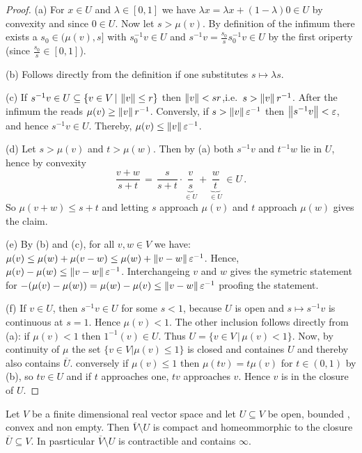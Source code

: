 \begin{proof}
(a) For $x\in U$ and $\lambda\in [0,1]$ we have $\lambda x=\lambda x+(1-\lambda)0\in U$ by convexity and since $0\in U$. Now let $s>\mu(v)$. 
By definition of the infimum there exists a $s_0\in ( \mu(v),s]$ with $s_0^{-1}v\in U$ and $s^{-1}v=\frac{s_0}{s}s_0^{-1}v\in U$ by the first oriperty (since $\frac{s_0}{s}\in [0,1]$).

(b) Follows directly from the definition if one substitutes $s\mapsto \lambda s$.

(c) If $s^{-1}v\in U\subseteq \{v\in V\,|\,\left\lVert v\right\rVert\leq r\}$ then $\left\lVert v\right\rVert<sr$,i.e.\ $s>\left\lVert v\right\rVert r^{-1}$. After the infimum the reads $\mu(v)\geq \left\lVert v\right\rVert r^{-1}$. Conversly, if $s>\left\lVert v\right\rVert\varepsilon^{-1}$ then $\left\lVert s^{-1}v\right\rVert<\varepsilon$, and hence $s^{-1}v\in U$. Thereby, $\mu(v)\leq \left\lVert v\right\rVert\varepsilon^{-1}$.

(d) Let $s>\mu(v)$ and $t>\mu(w)$. Then by (a) both $s^{-1}v$ and $t^{-1}w$ lie in $U$, hence by convexity
\begin{equation*}
    \frac{v+w}{s+t}\,=\,\frac{s}{s+t}\cdot \underbrace{\frac{v}{s}}_{\in U}+\underbrace{\frac{w}{t}}_{\in U}\,\in U\,.
\end{equation*} So $\mu(v+w)\leq{s+t}$ and letting $s$ approach $\mu(v)$ and $t$ approach $\mu(w)$ gives the claim.

(e) By (b) and (c), for all $v,w\in V$ we have: $\mu(v)\leq \mu(w)+\mu(v-w)\leq \mu(w)+\left\lVert v-w\right\rVert\varepsilon^{-1}$. Hence, $\mu(v)-\mu(w)\leq \left\lVert v-w\right\rVert\varepsilon^{-1}$. Interchangeing $v$ and $w$ gives the symetric statement for $-(\mu(v)-\mu(w))=\mu(w)-\mu(v)\leq \left\lVert v-w\right\rVert\varepsilon^{-1}$ proofing the statement.

(f) If $v\in U$, then $s^{-1}v \in U$ for some $s<1$, because $U$ is open and $s\mapsto s^{-1}v$ is continuous at $s=1$. Hence $\mu(v)<1$. The other inclusion follows directly from (a): if $\mu(v)<1$ then $1^{-1}(v)\in U$. Thus $U=\{v\in V\,|\, \mu(v) <1\}$. Now, by continuity of $\mu$ the set $\{v\in V|\mu(v)\leq 1\}$ is closed and containes $U$ and thereby also contains $\overline{U}$. conversely if $\mu(v) \leq 1$ then $\mu(tv)=t\mu(v)$ for $t\in(0,1)$ by (b), so $tv\in U$ and if $t$ approaches one, $tv$ approaches $v$. Hence $v$ is in the closure of $U$.
\end{proof}
\begin{lemma}\label{lem:orient-admissableNeighbourhoodsGiveCompactPairs}
    Let $V$ be a finite dimensional real vector space and let $U\subseteq V$ be open, bounded , convex and non empty. Then $\overline{V}\setminus U$ is compact and homeommorphic to the closure $\overline{U}\subseteq V$. In pasrticular $\overline{V}\setminus U $ is contractible and contains $\infty$.
\end{lemma}
